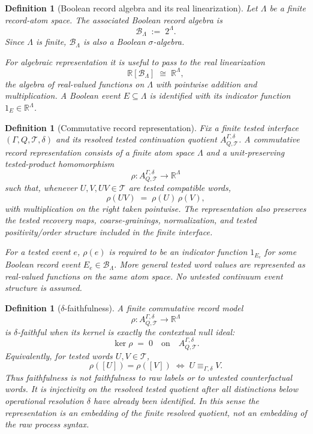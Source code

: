 \documentclass[11pt]{article}
\newtheorem{definition}[theorem]{Definition}
\newcommand{\R}{\mathbb R}
\begin{document}
\begin{definition}[Boolean record algebra and its real linearization]\label{def:boolean-record-algebra}
Let $\Lambda$ be a finite record-atom space.  The associated Boolean
record algebra is
\[
    \mathcal B_\Lambda \;:=\; 2^\Lambda.
\]
Since $\Lambda$ is finite, $\mathcal B_\Lambda$ is also a Boolean
$\sigma$-algebra.

For algebraic representation it is useful to pass to the real
linearization
\[
    \R[\mathcal B_\Lambda] \;\cong\; \R^\Lambda,
\]
the algebra of real-valued functions on $\Lambda$ with pointwise
addition and multiplication.  A Boolean event $E\subseteq\Lambda$ is
identified with its indicator function
$1_E\in\R^\Lambda$.
\end{definition}

\begin{definition}[Commutative record representation]\label{def:finite-commutative-record-model}
Fix a finite tested interface $(\Gamma,Q,\mathcal T,\delta)$ and its
resolved tested continuation quotient
$A^{\Gamma,\delta}_{Q,\mathcal T}$.  A \emph{commutative record
representation} consists of a finite atom space $\Lambda$ and a
unit-preserving tested-product homomorphism
\[
    \rho:A^{\Gamma,\delta}_{Q,\mathcal T}
    \longrightarrow \R^\Lambda
\]
such that, whenever $U,V,UV\in\mathcal T$ are tested compatible words,
\[
    \rho(UV)\;=\;\rho(U)\,\rho(V),
\]
with multiplication on the right taken pointwise.  The representation
also preserves the tested recovery maps, coarse-grainings,
normalization, and tested positivity/order structure included in the
finite interface.

For a tested event $e$, $\rho(e)$ is required to be an indicator
function $1_{E_e}$ for some Boolean record event
$E_e\in\mathcal B_\Lambda$.  More general tested word values are
represented as real-valued functions on the same atom space.  No
untested continuum event structure is assumed.
\end{definition}

\begin{definition}[$\delta$-faithfulness]\label{def:delta-faithfulness}
A finite commutative record model
\[
    \rho:A^{\Gamma,\delta}_{Q,\mathcal T}\to\R^\Lambda
\]
is \emph{$\delta$-faithful} when its kernel is exactly the contextual
null ideal:
\[
    \ker\rho \;=\; 0
    \quad\text{on}\quad
    A^{\Gamma,\delta}_{Q,\mathcal T}.
\]
Equivalently, for tested words $U,V\in\mathcal T$,
\[
    \rho([U])=\rho([V])
    \;\Longleftrightarrow\;
    U\equiv_{\Gamma,\delta}V.
\]
Thus faithfulness is not faithfulness to raw labels or to untested
counterfactual words.  It is injectivity on the resolved tested quotient
after all distinctions below operational resolution $\delta$ have
already been identified.  In this sense the representation is an
embedding of the finite resolved quotient, not an embedding of the raw
process syntax.
\end{definition}
\end{document}
